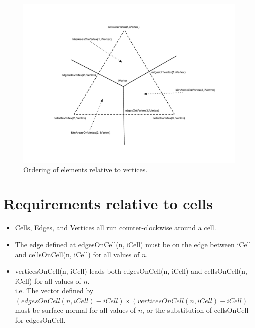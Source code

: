 \documentclass[11pt]{report}
\begin{document}
\begin{figure}[htp!]
	\centering
	\includegraphics[scale=0.4]{figures/VertexDiagram.pdf}
	\caption{Ordering of elements relative to vertices.}
\end{figure}

\section{Requirements relative to cells}

\begin{itemize}
	\item Cells, Edges, and Vertices all run counter-clockwise around a cell.
	\item The edge defined at edgesOnCell(n, iCell) must be on the edge between iCell and cellsOnCell(n, iCell) for all values of $n$.
	\item verticesOnCell(n, iCell) leads both edgesOnCell(n, iCell) and cellsOnCell(n, iCell) for all values of $n$. \\
		  i.e. The vector defined by \\
		  {\small $(edgesOnCell(n, iCell) - iCell) \times (verticesOnCell(n, iCell) - iCell)$} \\
		  must be surface normal for all values of $n$, or the substitution of cellsOnCell for edgesOnCell.
\end{itemize}
\end{document}
